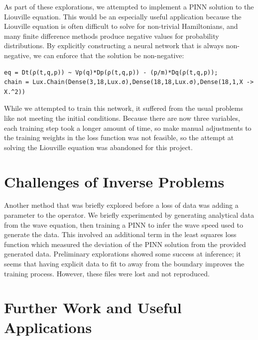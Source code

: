 \documentclass[11pt]{article}
\newcommand{\1}{\mathbf 1}
\begin{document}
As part of these explorations, we attempted to implement a PINN solution to the Liouville equation.
This would be an especially useful application because the Liouville equation is often difficult to solve for non-trivial Hamiltonians, and many finite difference methods produce negative values for probability distributions.
By explicitly constructing a neural network that is always non-negative, we can enforce that the solution be non-negative:
\begin{singlespace}
\begin{verbatim}
eq = Dt(ρ(t,q,p)) ~ Vp(q)*Dp(ρ(t,q,p)) - (p/m)*Dq(ρ(t,q,p));
chain = Lux.Chain(Dense(3,18,Lux.σ),Dense(18,18,Lux.σ),Dense(18,1,X -> X.^2))
\end{verbatim}
\end{singlespace}
\noindent
While we attempted to train this network, it suffered from the usual problems like not meeting the initial conditions.
Because there are now three variables, each training step took a longer amount of time, so make manual adjustments to the training weights in the loss function was not feasible, so the attempt at solving the Liouville equation was abandoned for this project.

\section{Challenges of Inverse Problems}

Another method that was briefly explored before a loss of data was adding a parameter to the operator.
We briefly experimented by generating analytical data from the wave equation, then training a PINN to infer the wave speed used to generate the data.
This involved an additional term in the least squares loss function which measured the deviation of the PINN solution from the provided generated data.
Preliminary explorations showed some success at inference; it seems that having explicit data to fit to away from the boundary improves the training process.
However, these files were lost and not reproduced.

\section{Further Work and Useful Applications}
\end{document}
